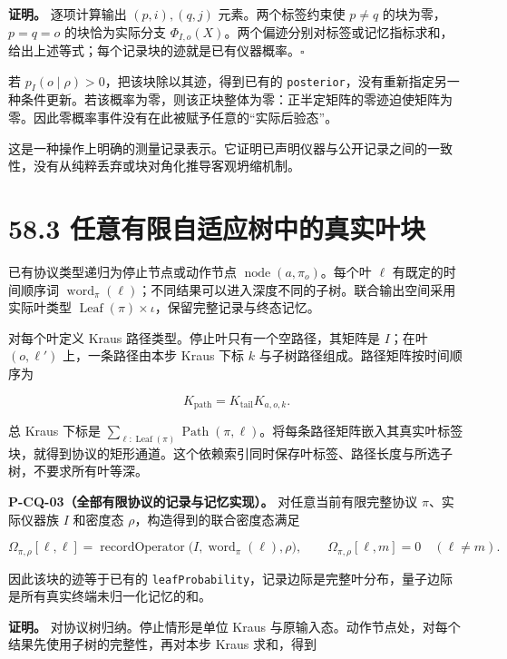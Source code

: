 \documentclass[
  11pt,
  oneside]{book}
\begin{document}
\textbf{证明。} 逐项计算输出 \((p,i),(q,j)\) 元素。两个标签约束使
\(p\ne q\) 的块为零，\(p=q=o\) 的块恰为实际分支
\(\Phi_{I,o}(X)\)。两个偏迹分别对标签或记忆指标求和，给出上述等式；每个记录块的迹就是已有仪器概率。\(\square\)

若 \(p_I(o\mid\rho)>0\)，把该块除以其迹，得到已有的
\texttt{posterior}，没有重新指定另一种条件更新。若该概率为零，则该正块整体为零：正半定矩阵的零迹迫使矩阵为零。因此零概率事件没有在此被赋予任意的``实际后验态''。

这是一种操作上明确的测量记录表示。它证明已声明仪器与公开记录之间的一致性，没有从纯粹丢弃或块对角化推导客观坍缩机制。

\hypertarget{ux4efbux610fux6709ux9650ux81eaux9002ux5e94ux6811ux4e2dux7684ux771fux5b9eux53f6ux5757}{%
\section{58.3
任意有限自适应树中的真实叶块}\label{ux4efbux610fux6709ux9650ux81eaux9002ux5e94ux6811ux4e2dux7684ux771fux5b9eux53f6ux5757}}

已有协议类型递归为停止节点或动作节点
\(\operatorname{node}(a,\pi_o)\)。每个叶 \(\ell\) 有既定的时间顺序词
\(\operatorname{word}_\pi(\ell)\)；不同结果可以进入深度不同的子树。联合输出空间采用实际叶类型
\(\operatorname{Leaf}(\pi)\times\iota\)，保留完整记录与终态记忆。

对每个叶定义 Kraus 路径类型。停止叶只有一个空路径，其矩阵是 \(I\)；在叶
\((o,\ell')\) 上，一条路径由本步 Kraus 下标 \(k\)
与子树路径组成。路径矩阵按时间顺序为

\[
K_{\text{path}}=K_{\text{tail}}K_{a,o,k}.
\]

总 Kraus 下标是
\(\sum_{\ell:\operatorname{Leaf}(\pi)}\operatorname{Path}(\pi,\ell)\)。将每条路径矩阵嵌入其真实叶标签块，就得到协议的矩形通道。这个依赖索引同时保存叶标签、路径长度与所选子树，不要求所有叶等深。

\protect\hypertarget{p-cq-03}{}{}

\textbf{P-CQ-03（全部有限协议的记录与记忆实现）。}
对任意当前有限完整协议 \(\pi\)、实际仪器族 \(I\) 和密度态
\(\rho\)，构造得到的联合密度态满足

\[
\Omega_{\pi,\rho}[\ell,\ell]
=\operatorname{recordOperator}\bigl(I,\operatorname{word}_\pi(\ell),\rho\bigr),
\qquad
\Omega_{\pi,\rho}[\ell,m]=0\quad(\ell\ne m).
\]

因此该块的迹等于已有的
\texttt{leafProbability}，记录边际是完整叶分布，量子边际是所有真实终端未归一化记忆的和。

\textbf{证明。} 对协议树归纳。停止情形是单位 Kraus
与原输入态。动作节点处，对每个结果先使用子树的完整性，再对本步 Kraus
求和，得到
\end{document}
